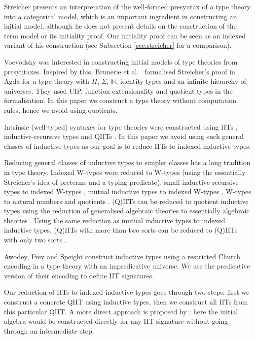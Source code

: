 \documentclass[a4paper,UKenglish,cleveref, autoref]{lipics-v2019}
\begin{document}
Streicher \cite{streichersemantics} presents an interpretation of the well-formed
presyntax of a type theory into a categorical model, which is an important
ingredient in constructing an initial model, although he does not present
details on the construction of the term model or its initiality proof. Our
initiality proof can be seen as an indexed variant of his construction
(see Subsection \ref{sec:streicher} for a comparison).

Voevodsky was interested in constructing initial models of type
theories from presyntaxes. Inspired by this, Brunerie et al.\ \cite{brunerie}
formalised Streicher's proof in Agda for a type theory with $\Pi$,
$\Sigma$, $\mathbb{N}$, identity types and an infinite hierarchy of
universes. They used UIP, function extensionality and quotient types in
the formalisation. In this paper we construct a type theory without
computation rules, hence we avoid using quotients.

Intrinsic (well-typed) syntaxes for type theories were constructed using
IITs \cite{chapman09eatitself}, inductive-recursive types
\cite{nisse,Altenkirch:2014:CO:2631172.2631176} and QIITs
\cite{ttintt}. In this paper we avoid using such general classes of
inductive types as our goal is to reduce IITs to indexed inductive
types.

Reducing general classes of inductive types to simpler classes has a
long tradition in type theory. Indexed W-types were reduced to W-types
\cite{indexedcont} (using the essentially Streicher's idea of preterms
and a typing predicate), small inductive-recursive types to indexed
W-types \cite{malatasta13smallir}, mutual inductive types to indexed
W-types \cite{mutual}, W-types to natural numbers and quotients
\cite{Ahrens2019}. (Q)IITs can be reduced to quotient inductive types
using the reduction of generalised algebraic theories to essentially
algebraic theories \cite{gat}. Using the same reduction as mutual
inductive types to indexed inductive types, (Q)IITs with more than two
sorts can be reduced to (Q)IITs with only two sorts \cite{szumiemail}.

Awodey, Frey and Speight \cite{DBLP:conf/lics/AwodeyFS18} construct
inductive types using a restricted Church encoding in a type theory
with an impredicative universe. We use the predicative version of
their encoding to define IIT signatures.

Our reduction of IITs to indexed inductive types goes through two
steps: first we construct a concrete QIIT using inductive types, then
we construct all IITs from this particular QIIT. A more direct
approach is proposed by \cite{erasure}: here the initial algebra would
be constructed directly for any IIT signature without going through an
intermediate step.
\end{document}

